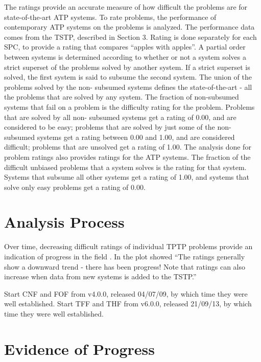 \documentclass[runningheads]{llncs}
\begin{document}
The ratings provide an accurate measure of how difficult the problems are for state-of-the-art 
ATP systems. 
To rate problems, the performance of contemporary ATP systems on the problems is analyzed. 
The performance data comes from the TSTP, described in Section 3. 
Rating is done separately for each SPC, to provide a rating that
compares “apples with apples”. A partial order between systems is determined according to whether or not a system solves a strict superset of the problems solved by another system. If a strict superset is solved, the first system is said to subsume the second system. The union of the problems solved by the non- subsumed systems defines the state-of-the-art - all the problems that are solved by any system. The fraction of non-subsumed systems that fail on a problem is the difficulty rating for the problem. Problems that are solved by all non- subsumed systems get a rating of 0.00, and are considered to be easy; problems that are solved by just some of the non-subsumed systems get a rating between 0.00 and 1.00, and are considered difficult; problems that are unsolved get a rating of 1.00.
The analysis done for problem ratings also provides ratings for the ATP systems. The fraction of the difficult unbiased problems that a system solves is the rating for that system. Systems that subsume all other systems get a rating of 1.00, and systems that solve only easy problems get a rating of 0.00.
\section{Analysis Process}
\label{Analysis}

Over time, decreasing difficult ratings of individual TPTP problems provide
an indication of progress in the field \cite{SFS01}.
In\cite{Sut17} the plot showed 
``The ratings generally show a downward trend - there has been progress!
Note that ratings can also increase when data from new systems is added to
the TSTP.''

Start CNF and FOF from v4.0.0, released 04/07/09, by which time they were well established.
Start TFF and THF from v6.0.0, released 21/09/13, by which time they were well established.

\section{Evidence of Progress}
\label{Evidence}
\end{document}
